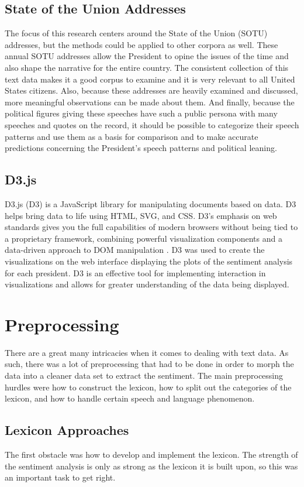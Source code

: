 \documentclass[acmtog, review, screen]{acmart}
\begin{document}
\subsection{State of the Union Addresses}
The focus of this research centers around the State of the Union (SOTU) addresses, but the methods could be applied to other corpora as well.
These annual SOTU addresses allow the President to opine the issues of the time and also shape the narrative for the entire country.
The consistent collection of this text data makes it a good corpus to examine and it is very relevant to all United States citizens.
Also, because these addresses are heavily examined and discussed, more meaningful observations can be made about them.
And finally, because the political figures giving these speeches have such a public persona with many speeches and quotes on the record, it should be possible to categorize their speech patterns and use them as a basis for comparison and to make accurate predictions concerning the President's speech patterns and political leaning.

\subsection{D3.js}
D3.js (D3) is a JavaScript library for manipulating documents based on data. 
D3 helps bring data to life using HTML, SVG, and CSS. 
D3's emphasis on web standards gives you the full capabilities of modern browsers without being tied to a proprietary framework, combining powerful visualization components and a data-driven approach to DOM manipulation \cite{d3}.
D3 was used to create the visualizations on the web interface displaying the plots of the sentiment analysis for each president.
D3 is an effective tool for implementing interaction in visualizations and allows for greater understanding of the data being displayed.

\section{Preprocessing}
There are a great many intricacies when it comes to dealing with text data.
As such, there was a lot of preprocessing that had to be done in order to morph the data into a cleaner data set to extract the sentiment.
The main preprocessing hurdles were how to construct the lexicon, how to split out the categories of the lexicon, and how to handle certain speech and language phenomenon.

\subsection{Lexicon Approaches}
The first obstacle was how to develop and implement the lexicon.
The strength of the sentiment analysis is only as strong as the lexicon it is built upon, so this was an important task to get right.
\end{document}
